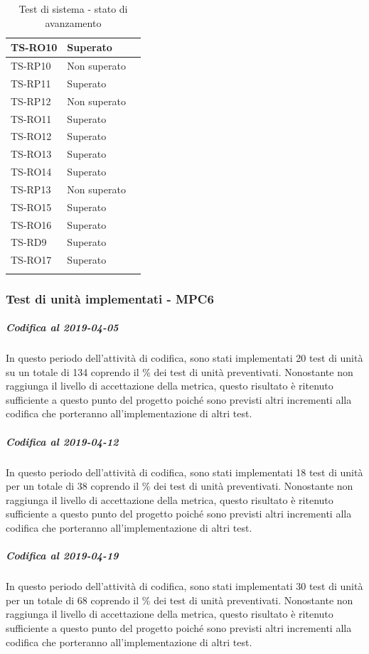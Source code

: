 \begin{longtable}{|>{\centering\arraybackslash}m{1.6cm}|>{\centering\arraybackslash}m{6.41cm}|>{\centering\arraybackslash}m{3.1cm}|}
		\rowcolor{LightGray}
		TS-RO10
		& Superato
		\\ \hline
		TS-RP10		
		& Non superato
		\\ \hline
		\rowcolor{LightGray}
		TS-RP11		
		& Superato
		\\ \hline
		TS-RP12		
		& Non superato
		\\ \hline	
		\rowcolor{LightGray}
		TS-RO11	
		& Superato
		\\ \hline
		TS-RO12	
		& Superato
		\\ \hline
		\rowcolor{LightGray}
		TS-RO13
		& Superato
		\\ \hline
		TS-RO14
		& Superato
		\\ \hline
		\rowcolor{LightGray}
		TS-RP13
		& Non superato
		\\ \hline
		TS-RO15
		& Superato
		\\ \hline
		\rowcolor{LightGray}
		TS-RO16	
		& Superato
		\\ \hline
		TS-RD9
		& Superato
		\\ \hline
		\rowcolor{LightGray}
		TS-RO17
		& Superato
		\\ \hline
		
		\caption{Test di sistema - stato di avanzamento}
\end{longtable}



\subsubsection{Test di unità implementati - MPC6}
\subparagraph{Codifica al 2019-04-05}
In questo periodo dell'attività di codifica, sono stati implementati 20 test di unità su un totale di 134 coprendo il \% dei test di unità preventivati.
Nonostante non raggiunga il livello di accettazione della
metrica, questo risultato è ritenuto sufficiente a questo punto del progetto poiché sono previsti altri incrementi alla codifica che porteranno all'implementazione di altri test.

\subparagraph{Codifica al 2019-04-12}
In questo periodo dell'attività di codifica, sono stati implementati 18 test di unità per un totale di 38 coprendo il \% dei test di unità preventivati.
Nonostante non raggiunga il livello di accettazione della
metrica, questo risultato è ritenuto sufficiente a questo punto del progetto poiché sono previsti altri incrementi alla codifica che porteranno all'implementazione di altri test.

\subparagraph{Codifica al 2019-04-19}
In questo periodo dell'attività di codifica, sono stati implementati 30 test di unità per un totale di 68 coprendo il \% dei test di unità preventivati.
Nonostante non raggiunga il livello di accettazione della
metrica, questo risultato è ritenuto sufficiente a questo punto del progetto poiché sono previsti altri incrementi alla codifica che porteranno all'implementazione di altri test.


